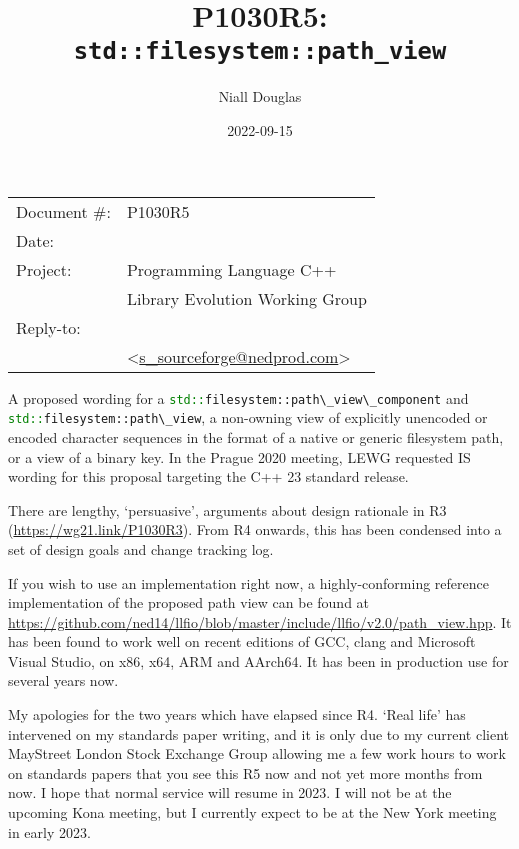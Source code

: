 \documentclass[11pt]{article}
\date{}
\title{P1030R5: \texttt{std::filesystem::path\_view}}
\makeatletter
\newcommand{\code}[2][cpp]{\lstinline[language=#1,basicstyle=\small\ttfamily]{#2}}
\newcommand{\emailaddress}{s\_sourceforge@nedprod.com}
\newcommand{\email}{\href{mailto:\emailaddress}{\emailaddress}}
\makeatother
\begin{document}
\maketitle\vspace{-2cm}

\begin{flushright}
  \begin{tabular}{ll}
  Document \#:&P1030R5\\
  Date:       &\date{2022-09-15}\\
  Project:    &Programming Language C++\\
              &Library Evolution Working Group\\
  Reply-to:   &\author{Niall Douglas}\\
              &\textless\email\textgreater
  \end{tabular}
\end{flushright}

A proposed wording for a \code{std::filesystem::path\_view\_component} and \code{std::filesystem::path\_view}, a non-owning view of explicitly unencoded or encoded character sequences in the format of a native or generic filesystem path, or a view of a binary key. In the Prague 2020 meeting, LEWG requested IS wording for this proposal targeting the C++ 23 standard release.

There are lengthy, `persuasive', arguments about design rationale in R3 (\url{https://wg21.link/P1030R3}). From R4 onwards, this has been condensed into a set of design goals and change tracking log.

If you wish to use an implementation right now, a highly-conforming reference implementation of the proposed path view can be found at \url{https://github.com/ned14/llfio/blob/master/include/llfio/v2.0/path\_view.hpp}. It has been found to work well on recent editions of GCC, clang and Microsoft Visual Studio, on x86, x64, ARM and AArch64. It has been in production use for several years now.

My apologies for the two years which have elapsed since R4. `Real life' has intervened on my standards paper writing, and it is only due to my current client MayStreet London Stock Exchange Group allowing me a few work hours to work on standards papers that you see this R5 now and not yet more months from now. I hope that normal service will resume in 2023. I will not be at the upcoming Kona meeting, but I currently expect to be at the New York meeting in early 2023.

\tableofcontents
\end{document}
